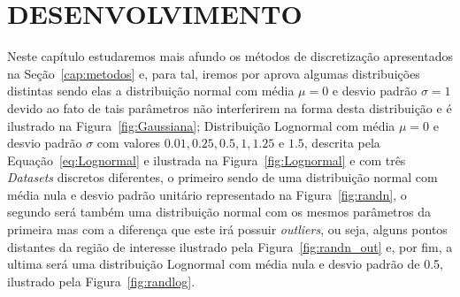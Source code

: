 \chapter{DESENVOLVIMENTO} \label{cap:desenvolvimento}

Neste capítulo estudaremos mais afundo os métodos de discretização apresentados na Seção~\ref{cap:metodos} e, para tal, iremos por aprova algumas distribuições distintas sendo elas a distribuição normal com média $ \mu =0 $ e desvio padrão $ \sigma = 1 $ devido ao fato de tais parâmetros não interferirem na forma desta distribuição e é ilustrado na Figura~\ref{fig:Gaussiana}; Distribuição Lognormal com média $ \mu = 0 $ e desvio padrão $\sigma$ com valores $0.01, 0.25, 0.5, 1, 1.25$ e $1.5$, descrita pela Equação~\eqref{eq:Lognormal} e ilustrada na Figura~\ref{fig:Lognormal} e com três \textit{Datasets} discretos diferentes, o primeiro sendo de uma distribuição normal com média nula e desvio padrão unitário representado na Figura~\ref{fig:randn}, o segundo será também uma distribuição normal com os mesmos parâmetros da primeira mas com a diferença que este irá possuir \textit{outliers}, ou seja, alguns pontos distantes da região de interesse ilustrado pela Figura~\ref{fig:randn_out} e, por fim, a ultima será uma distribuição Lognormal com média nula e desvio padrão de 0.5, ilustrado pela Figura~\ref{fig:randlog}.






